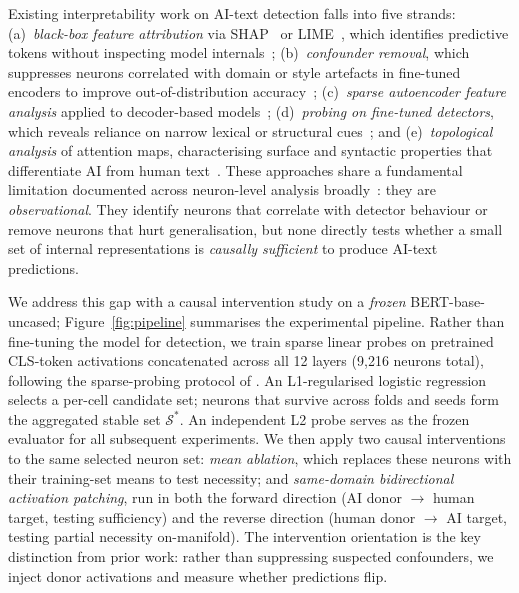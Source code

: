 \documentclass[11pt]{article}
\newcommand{\bertbase}{BERT-base-uncased\xspace}
\begin{document}
Existing interpretability work on AI-text detection falls into five strands: (a)~\textit{black-box feature attribution} via SHAP~\citep{lundberg2017shap} or LIME~\citep{ribeiro2016lime}, which identifies predictive tokens without inspecting model internals~\cite{pudasaini2026why}; (b)~\textit{confounder removal}, which suppresses neurons correlated with domain or style artefacts in fine-tuned encoders to improve out-of-distribution accuracy~\cite{borile2025confounding}; (c)~\textit{sparse autoencoder feature analysis} applied to decoder-based models~\cite{kuznetsov2025sae}; (d)~\textit{probing on fine-tuned detectors}, which reveals reliance on narrow lexical or structural cues~\citep{choi2025probing}; and (e)~\textit{topological analysis} of attention maps, characterising surface and syntactic properties that differentiate AI from human text~\citep{kushnareva2021topology}. These approaches share a fundamental limitation documented across neuron-level analysis broadly~\citep{sajjad2022survey}: they are \textit{observational}. They identify neurons that correlate with detector behaviour or remove neurons that hurt generalisation, but none directly tests whether a small set of internal representations is \textit{causally sufficient} to produce AI-text predictions.

We address this gap with a causal intervention study on a \textit{frozen} \bertbase; Figure~\ref{fig:pipeline} summarises the experimental pipeline. Rather than fine-tuning the model for detection, we train sparse linear probes on pretrained CLS-token activations concatenated across all 12 layers (9{,}216 neurons total), following the sparse-probing protocol of \citet{gurnee2023haystack}. An L1-regularised logistic regression selects a per-cell candidate set; neurons that survive across folds and seeds form the aggregated stable set $\mathcal{S}^{*}$. An independent L2 probe serves as the frozen evaluator for all subsequent experiments. We then apply two causal interventions to the same selected neuron set: \textit{mean ablation}, which replaces these neurons with their training-set means to test necessity; and \textit{same-domain bidirectional activation patching}, run in both the forward direction (AI donor $\to$ human target, testing sufficiency) and the reverse direction (human donor $\to$ AI target, testing partial necessity on-manifold). The intervention orientation is the key distinction from prior work: rather than suppressing suspected confounders, we inject donor activations and measure whether predictions flip.
\end{document}
